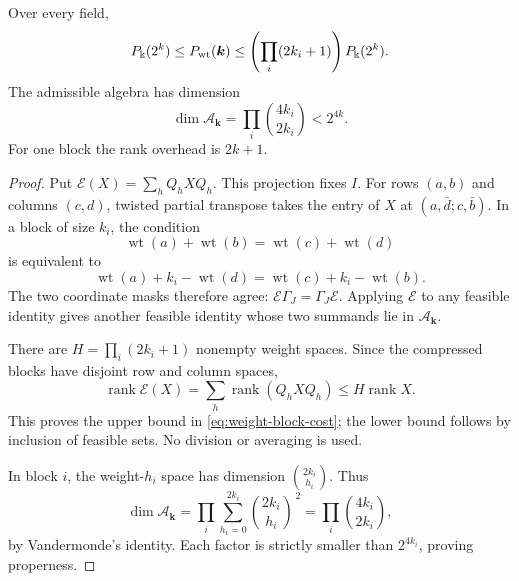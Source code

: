 \begin{proposition}
\label{prop:weight-block-gate}
Over every field,
\begin{equation}\label{eq:weight-block-cost}
 P_\Bbbk(2^k)\leq P_{\rm wt}(\boldsymbol k)
 \leq\left(\prod_i(2k_i+1)\right)P_\Bbbk(2^k).
\end{equation}
The admissible algebra has dimension
\begin{equation}\label{eq:weight-block-dimension}
 \dim\mathcal A_{\boldsymbol k}
   =\prod_i\binom{4k_i}{2k_i}<2^{4k}.
\end{equation}
For one block the rank overhead is \(2k+1\).
\end{proposition}
\begin{proof}
Put \(\mathcal E(X)=\sum_hQ_hXQ_h\). This projection fixes \(I\).
For rows \((a,b)\) and columns \((c,d)\), twisted partial transpose
takes the entry of \(X\) at
\((a,\bar d;c,\bar b)\). In a block of size \(k_i\), the condition
\[
 \operatorname{wt}(a)+\operatorname{wt}(b)
 =\operatorname{wt}(c)+\operatorname{wt}(d)
\]
is equivalent to
\[
 \operatorname{wt}(a)+k_i-\operatorname{wt}(d)
 =\operatorname{wt}(c)+k_i-\operatorname{wt}(b).
\]
The two coordinate masks therefore agree:
\(\mathcal E\Gamma_J=\Gamma_J\mathcal E\).
Applying \(\mathcal E\) to any feasible identity gives another
feasible identity whose two summands lie in
\(\mathcal A_{\boldsymbol k}\).

There are \(H=\prod_i(2k_i+1)\) nonempty weight spaces. Since the
compressed blocks have disjoint row and column spaces,
\[
 \operatorname{rank}\mathcal E(X)
 =\sum_h\operatorname{rank}(Q_hXQ_h)
 \leq H\operatorname{rank}X.
\]
This proves the upper bound in \eqref{eq:weight-block-cost};
the lower bound follows by inclusion of feasible sets.
No division or averaging is used.

In block \(i\), the weight-\(h_i\) space has dimension
\(\binom{2k_i}{h_i}\). Thus
\[
 \dim\mathcal A_{\boldsymbol k}
 =\prod_i\sum_{h_i=0}^{2k_i}\binom{2k_i}{h_i}^{\,2}
 =\prod_i\binom{4k_i}{2k_i},
\]
by Vandermonde's identity. Each factor is strictly smaller than
\(2^{4k_i}\), proving properness.
\end{proof}

